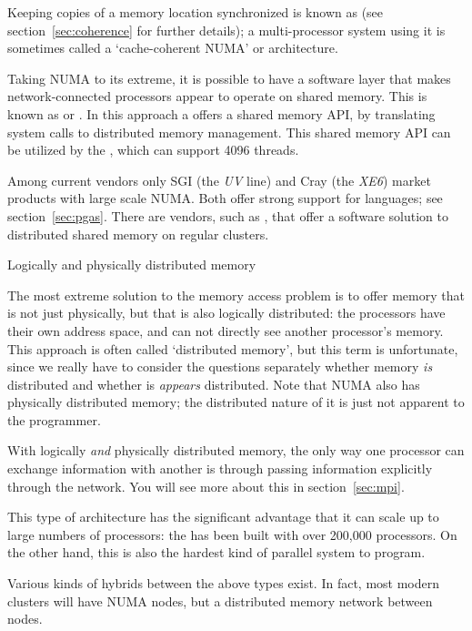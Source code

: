 Keeping copies of a memory location synchronized is known as
 (see section~\ref{sec:coherence} for further details);
a multi-processor system using it is sometimes called a
`cache-coherent NUMA' or  architecture.

Taking NUMA to its extreme, it is possible to have a software layer
that makes network-connected processors appear to operate on shared memory.
This is known as  
or . In this approach
a  offers a shared memory API, by translating
system calls to distributed memory management. This shared memory 
API can be utilized by the , which
can support 4096 threads.

Among current vendors only SGI (the \emph{UV} line) and
Cray (the \emph{XE6}) market products with large scale
NUMA. Both offer strong support for  languages; see
section~\ref{sec:pgas}. There are vendors, such as ,
that offer a software solution to distributed shared memory on regular clusters.

 {Logically and physically distributed memory}

The most extreme solution to the memory access problem is to offer
memory that is not just physically, but that is also logically
distributed: the processors have their own address space, and can not
directly see another processor's memory. This approach is often called
`distributed memory', but this term is unfortunate, since we really
have to consider the questions separately whether memory \emph{is}
distributed and whether is \emph{appears} distributed.
Note that NUMA also has physically
distributed memory; the distributed nature of it is just not apparent
to the programmer.

With logically \emph{and} physically distributed memory, the only way
one processor can exchange information with another is through passing
information explicitly through the network. You will see more about
this in section~\ref{sec:mpi}.

This type of architecture has the significant advantage that it can
scale up to large numbers of processors: the
 has been built with over 200,000
processors. On the other hand, this is also the hardest kind of
parallel system to program.

Various kinds of hybrids between the above types exist. In fact,
most modern clusters will have \ac{NUMA} nodes, but a distributed
memory network between nodes.

